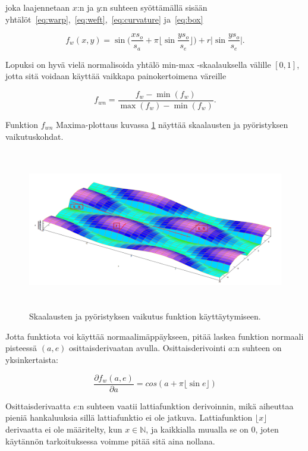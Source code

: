 \documentclass[utf8,bachelor]{gradu3}
\begin{document}
joka laajennetaan $x$:n ja $y$:n suhteen syöttämällä sisään yhtälöt~\eqref{eq:warp},~\eqref{eq:weft},~\eqref{eq:curvature} ja~\eqref{eq:box}

\begin{equation}
\label{eq:weave_xy}
f_w(x,y) = \sin{\big(\frac{xs_o}{s_a} + \pi \lfloor \sin{\frac{ys_o}{s_e}} \rfloor\big)} + r\lvert\sin{\frac{ys_o}{s_e}}\rvert.
\end{equation}

Lopuksi on hyvä vielä normalisoida yhtälö min-max -skaalauksella välille $\left[0,1\right]$, jotta sitä voidaan käyttää vaikkapa painokertoimena väreille

\begin{equation}
\label{eq:weave_norm}
f_{wn} = \frac{f_w-\min{(f_w)}}{\max{(f_w)}-\min{(f_w)}}.
\end{equation}

Funktion $f_{wn}$ Maxima-plottaus kuvassa \ref{fig:maxima_scale} näyttää skaalausten ja pyöristyksen vaikutuskohdat. 

\begin{figure}[h] 
	\centering
	\includegraphics[height=7cm]{weave_plot_scales_maxima_small.png}
	\caption{Skaalausten ja pyöristyksen vaikutus funktion käyttäytymiseen.}
	\label{fig:maxima_scale}
\end{figure}

Jotta funktiota voi käyttää normaalimäppäykseen, pitää laskea funktion normaali pisteessä $(a,e)$ osittaisderivaatan avulla. Osittaisderivointi $a$:n suhteen on yksinkertaista:

\begin{equation}
\label{eq:partialA}
\frac{\partial f_w(a,e)}{\partial a} = cos(a + \pi\lfloor \sin{e} \rfloor )
\end{equation}

Osittaisderivaatta $e$:n suhteen vaatii lattiafunktion derivoinnin, mikä aiheuttaa pieniä hankaluuksia sillä lattiafunktio ei ole jatkuva. Lattiafunktion $\lfloor x \rfloor $ derivaatta ei ole määritelty, kun $ x \in \mathbb{N}$, ja kaikkialla muualla se on $0$, joten käytännön tarkoituksessa voimme pitää sitä aina nollana.
\end{document}
